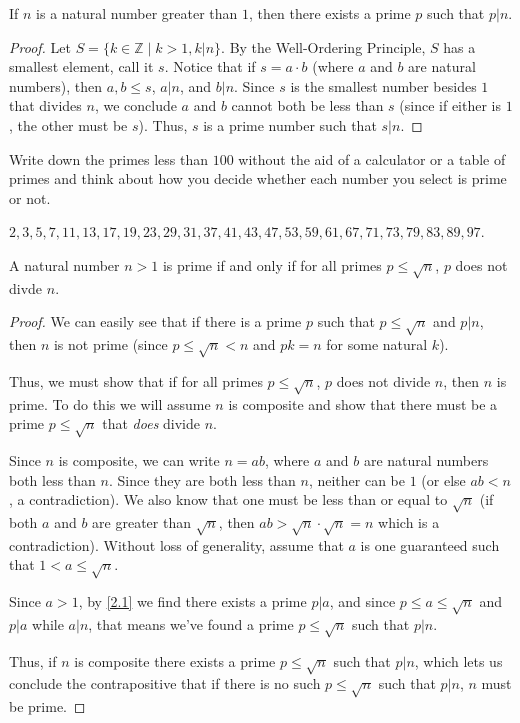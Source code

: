 \documentclass[../main.tex]{subfiles}
\begin{document}
\begin{thm} \label{2.1}
  If $n$ is a natural number greater than $1$, then there exists a prime $p$ such that $p | n$.
\end{thm}

\begin{proof}
  Let $S = \{k \in \mathbb{Z} \mid k > 1, k | n\}$. By the Well-Ordering Principle, $S$ has a smallest element, call it $s$. Notice that if $s = a \cdot b$ (where $a$ and $b$ are natural numbers), then $a, b \leq s$, $a | n$, and $b | n$. Since $s$ is the smallest number besides $1$ that divides $n$, we conclude $a$ and $b$ cannot both be less than $s$ (since if either is $1$, the other must be $s$). Thus, $s$ is a prime number such that $s | n$.
\end{proof}



\begin{ex} \label{2.2}
  Write down the primes less than $100$ without the aid of a calculator or a table of primes and think about how you decide whether each number you select is prime or not.
\end{ex}

$2, 3, 5, 7, 11, 13, 17, 19, 23, 29, 31, 37, 41, 43, 47, 53, 59, 61, 67, 71, 73, 79, 83, 89, 97$.



\begin{thm} \label{2.3}
  A natural number $n > 1$ is prime if and only if for all primes $p \leq \sqrt{n}$, $p$ does not divde $n$.
\end{thm}

\begin{proof}
  We can easily see that if there is a prime $p$ such that $p \leq \sqrt{n}$ and $p | n$, then $n$ is not prime (since $p \leq \sqrt{n} < n$ and $pk = n$ for some natural $k$).

  Thus, we must show that if for all primes $p \leq \sqrt{n}$, $p$ does not divide $n$, then $n$ is prime. To do this we will assume $n$ is composite and show that there must be a prime $p \leq \sqrt{n}$ that \emph{does} divide $n$.

  Since $n$ is composite, we can write $n = ab$, where $a$ and $b$ are natural numbers both less than $n$. Since they are both less than $n$, neither can be $1$ (or else $ab < n$, a contradiction). We also know that one must be less than or equal to $\sqrt{n}$ (if both $a$ and $b$ are greater than $\sqrt{n}$, then $ab > \sqrt{n} \cdot \sqrt{n} = n$ which is a contradiction). Without loss of generality, assume that $a$ is one guaranteed such that $1 < a \leq \sqrt{n}$.

  Since $a > 1$, by \ref{2.1} we find there exists a prime $p | a$, and since $p \leq a \leq \sqrt{n}$ and $p | a$ while $a | n$, that means we've found a prime $p \leq \sqrt{n}$ such that $p | n$.

  Thus, if $n$ is composite there exists a prime $p \leq \sqrt{n}$ such that $p | n$, which lets us conclude the contrapositive that if there is no such $p \leq \sqrt{n}$ such that $p | n$, $n$ must be prime.
\end{proof}
\end{document}
